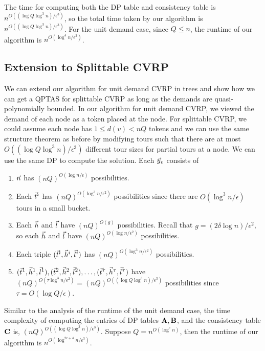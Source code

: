 \documentclass[twoside,leqno]{article}
\newcommand{\eps}{\epsilon}
\begin{document}
The time for computing both the DP table and consistency table is $n^{O((\log Q\log^3 n)/\eps^3)}$, so the total time taken by our algorithm is $n^{O((\log Q\log^3 n)/\eps^3)}$. For the unit demand case, since $Q \le n$, the runtime of our algorithm is $n^{O(\log^4 n/\eps^3)}$.

\subsection{Extension to Splittable CVRP}
We can extend our algorithm for unit demand CVRP in trees and show how we can get a QPTAS for splittable CVRP as long as the demands are quasi-polynomially bounded. In our algorithm for unit demand CVRP, we viewed the demand of each node as a token placed at the node. For splittable CVRP, we could assume each node has $1 \le d(v) < nQ$ tokens and we can use the same structure theorem as before by modifying tours such that there are at most $O((\log Q \log^3 n)/\eps^3)$ different tour sizes for partial tours at a node. We can use the same DP to compute the solution. Each $\vec{y}_v$ consists of 
\begin{enumerate}
    \item $\vec{n}$ has $(nQ)^{O(\log n / \eps)}$ possibilities. 
    \item Each $\vec{t}^i$ has $(nQ)^{O(\log^3 n /\eps^2)}$ possibilities since there are $O(\log^3 n /\eps)$ tours in a small bucket. 
    \item Each $\vec{h}$ and $\vec{l}$ have $(nQ)^{O(g)}$ possibilities. Recall that $g = (2\delta \log n)/\eps^2 $, so each $\vec{h}$ and $\vec{l}$ have $(nQ)^{O(\log n /\eps^2)}$ possibilities. 
    \item Each triple $(\vec{t}^i, \vec{h}^i, \vec{l}^i)$ has $(nQ)^{O(\log^3 n /\eps^2)}$ possibilities. 
    \item $(\vec{t}^1, \vec{h}^1, \vec{l}^1), (\vec{t}^2, \vec{h}^2, \vec{l}^2), \ldots, (\vec{t}^\tau, \vec{h}^\tau, \vec{l}^\tau)$ have $(nQ)^{O(\tau \log^3 n /\eps^2)} = (nQ)^{O((\log Q\log^3 n)/\eps^3)}$ possibilities since $\tau = O(\log Q/\eps)$. 
\end{enumerate}
Similar to the analysis of the runtime of the unit demand case, the time complexity of computing the entries of DP tables $\textbf{A}, \textbf{B}$, and the consistency table $\textbf{C}$ is, $(nQ)^{O((\log Q\log^3 n)/\eps^3)}$. Suppose $Q = n^{O(\log^c n)}$, then the runtime of our algorithm is $n^{O(\log^{2c+4} n/\eps^3)}$.

\end{document}
